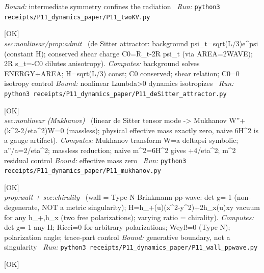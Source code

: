 \begin{description}
 \emph{Bound:} intermediate symmetry confines the radiation
\ \emph{Run:} \texttt{python3 receipts/P11\_dynamics\_paper/P11\_twoKV.py}
\item[\label{rcpt:P11_deSitter_attractor}\texttt{P11\_deSitter\_attractor}]\hfill\textsf{[OK]}\\
\textit{sec:nonlinear/prop:admit} \ (de Sitter attractor: background psi\_t=sqrt(L/3)e\textasciicircum{}psi (constant H); conserved shear charge C0=R\_t-2R psi\_t (via AREA=2WAVE); 2R s\_t=-C0 dilutes anisotropy). 
\emph{Computes:} background solves ENERGY+AREA; H=sqrt(L/3) const; C0 conserved; shear relation; C0=0 isotropy control
 \emph{Bound:} nonlinear Lambda>0 dynamics isotropizes
\ \emph{Run:} \texttt{python3 receipts/P11\_dynamics\_paper/P11\_deSitter\_attractor.py}
\item[\label{rcpt:P11_mukhanov}\texttt{P11\_mukhanov}]\hfill\textsf{[OK]}\\
\textit{sec:nonlinear (Mukhanov)} \ (linear de Sitter tensor mode -> Mukhanov W''+(k\textasciicircum{}2-2/eta\textasciicircum{}2)W=0 (massless); physical effective mass exactly zero, naive 6H\textasciicircum{}2 is a gauge artifact). 
\emph{Computes:} Mukhanov transform W=a deltapsi symbolic; a''/a=2/eta\textasciicircum{}2; massless reduction; naive m\textasciicircum{}2=6H\textasciicircum{}2 gives +4/eta\textasciicircum{}2; m\textasciicircum{}2 residual control
 \emph{Bound:} effective mass zero
\ \emph{Run:} \texttt{python3 receipts/P11\_dynamics\_paper/P11\_mukhanov.py}
\item[\label{rcpt:P11_wall_ppwave}\texttt{P11\_wall\_ppwave}]\hfill\textsf{[OK]}\\
\textit{prop:wall + sec:chirality} \ (wall = Type-N Brinkmann pp-wave: det g=-1 (non-degenerate, NOT a metric singularity); H=h\_+(u)(x\textasciicircum{}2-y\textasciicircum{}2)+2h\_x(u)xy vacuum for any h\_+,h\_x (two free polarizations); varying ratio = chirality). 
\emph{Computes:} det g=-1 any H; Ricci=0 for arbitrary polarizations; Weyl!=0 (Type N); polarization angle; trace-part control
 \emph{Bound:} generative boundary, not a singularity
\ \emph{Run:} \texttt{python3 receipts/P11\_dynamics\_paper/P11\_wall\_ppwave.py}
\item[\label{rcpt:P11_unpolarized_gowdy_cut}\texttt{P11\_unpolarized\_gowdy\_cut}]\hfill\textsf{[OK]}\\

\end{description}
